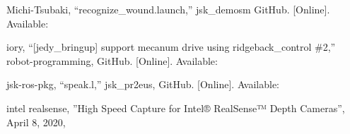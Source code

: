 \documentclass[10pt, oneside, titlepage]{ltjsarticle}  %
\begin{document}
\begin{thebibliography}{9}
Michi-Tsubaki, ``recognize\_wound.launch,'' jsk\_demosm GitHub. [Online]. Available: 

iory, ``[jedy\_bringup] support mecanum drive using ridgeback\_control \#2,'' robot-programming, GitHub. [Online]. Available: 

jsk-ros-pkg, ``speak.l,'' jsk\_pr2eus, GitHub. [Online]. Available: 

intel realsense, ''High Speed Capture for Intel® RealSense™ Depth Cameras'', April 8, 2020,
\end{thebibliography}
\end{document}
